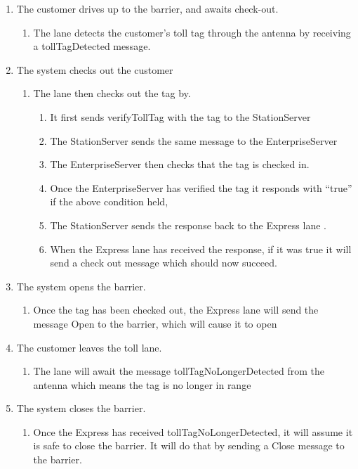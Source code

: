 \begin{enumerate}
\item The customer drives up to the barrier, and awaits check-out.

\begin{enumerate}
\item The lane detects the customer's toll tag through the antenna by receiving
a tollTagDetected message.
\end{enumerate}
\item The system checks out the customer

\begin{enumerate}
\item The lane then checks out the tag by. 

\begin{enumerate}
\item It first sends verifyTollTag with the tag to the StationServer
\item The StationServer sends the same message to the EnterpriseServer
\item The EnterpriseServer then checks that the tag is checked in.
\item Once the EnterpriseServer has verified the tag it responds with ``true''
if the above condition held,
\item The StationServer sends the response back to the Express lane .
\item When the Express lane has received the response, if it was true it
will send a check out message which should now succeed.
\end{enumerate}
\end{enumerate}
\item The system opens the barrier.

\begin{enumerate}
\item Once the tag has been checked out, the Express lane will send the
message Open to the barrier, which will cause it to open
\end{enumerate}
\item The customer leaves the toll lane.

\begin{enumerate}
\item The lane will await the message tollTagNoLongerDetected from the antenna
which means the tag is no longer in range
\end{enumerate}
\item The system closes the barrier.

\begin{enumerate}
\item Once the Express has received tollTagNoLongerDetected, it will assume
it is safe to close the barrier. It will do that by sending a Close
message to the barrier.\end{enumerate}
\end{enumerate}


